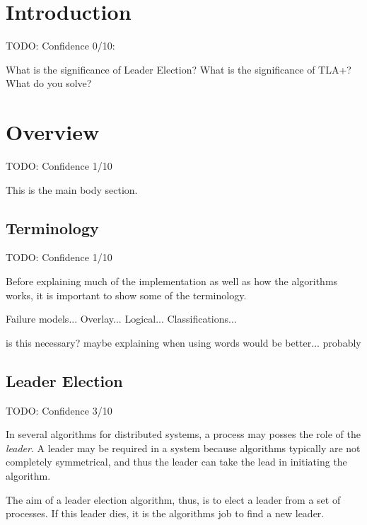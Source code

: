 \documentclass{report}
\begin{document}
\tableofcontents

\chapter{Introduction}
\begin{callout}
  TODO: Confidence 0/10:

  What is the significance of Leader Election? What is the significance of TLA+? What do you solve?
\end{callout}

\chapter{Overview}
\begin{callout}
TODO: Confidence 1/10
\end{callout}

This is the main body section.

\section{Terminology}
\begin{callout}
TODO: Confidence 1/10
\end{callout}


Before explaining much of the implementation as well as how the algorithms works, it is important to show some of the terminology.

Failure models...
Overlay...
Logical...
Classifications...

\begin{callout}
  is this necessary? maybe explaining when using words would be better... probably
  \end{callout}

\section{Leader Election}
\begin{callout}
TODO: Confidence 3/10
\end{callout}

In several algorithms for distributed systems, a process may posses the role of the \textit{leader}. A leader may be required in a system because algorithms typically are not completely symmetrical, and thus the leader can take the lead in initiating the algorithm. \cite{kshemkalyani2011distributed}

The aim of a leader election algorithm, thus, is to elect a leader from a set of processes. If this leader dies, it is the algorithms job to find a new leader.
\end{document}
